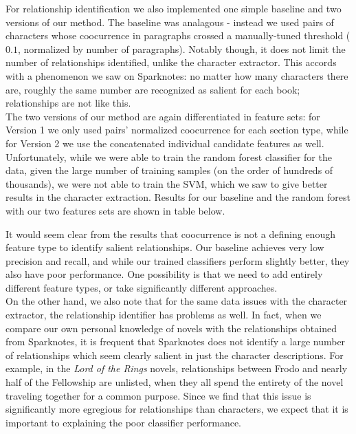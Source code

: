 \documentclass[12pt]{article}
\begin{document}
        For relationship identification we also implemented one simple baseline and two versions of our method.
        The baseline was analagous - instead we used pairs of characters whose coocurrence in paragraphs crossed 
        a manually-tuned threshold ($0.1$, normalized by number of paragraphs). Notably though, it does not
        limit the number of relationships identified, unlike the character extractor. This accords with a
        phenomenon we saw on Sparknotes: no matter how many characters there are, roughly the same number
        are recognized as salient for each book; relationships are not like this. \\

        The two versions of our method are again differentiated in feature sets: for Version 1 we only used
        pairs' normalized coocurrence for each section type, while for Version 2 we use the concatenated
        individual candidate features as well. Unfortunately, while we were able to train the random
        forest classifier for the data, given the large number of training samples (on the order of hundreds
        of thousands), we were not able to train the SVM, which we saw to give better results
        in the character extraction. Results for our baseline and the random forest with our two
        features sets are shown in table below.


        It would seem clear from the results that coocurrence is not a defining enough feature type to
        identify salient relationships. Our baseline achieves very low precision and recall, and while
        our trained classifiers perform slightly better, they also have poor performance. One possibility
        is that we need to add entirely different feature types, or take significantly different
        approaches. \\

        On the other hand, we also note that for the same data issues with the character extractor,
        the relationship identifier has problems as well. In fact, when we compare our own personal
        knowledge of novels with the relationships obtained from Sparknotes, it is frequent that
        Sparknotes does not identify a large number of relationships which seem clearly salient in
        just the character descriptions. For example, in the \emph{Lord of the Rings} novels,
        relationships between Frodo and nearly half of the Fellowship are unlisted, when they all
        spend the entirety of the novel traveling together for a common purpose. Since we find that
        this issue is significantly more egregious for relationships than characters, we expect
        that it is important to explaining the poor classifier performance.
\end{document}

